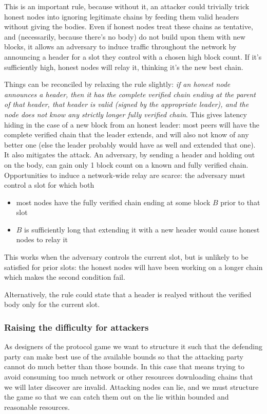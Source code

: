 \documentclass{article}
\theoremstyle{definition}{
  \newtheorem{lemma}{Lemma}[section] %
  \newtheorem{definition}[lemma]{Definition}
}
\theoremstyle{theorem}{
  \newtheorem{invariant}[lemma]{Invariant}
  \newtheorem{proofobligation}[lemma]{Proof Obligation}
}
\numberwithin{equation}{lemma}
\begin{document}
This is an important rule, because without it, an attacker could trivially
trick honest nodes into ignoring legitimate chains by feeding them valid
headers without giving the bodies. Even if honest nodes treat these chains as
tentative, and (necessarily, because there's no body) do not build upon them
with new blocks, it allows an adversary to induce traffic throughout the
network by announcing a header for a slot they control with a chosen high
block count. If it's sufficiently high, honest nodes will relay it, thinking
it's the new best chain.

Things can be reconciled by relaxing the rule slightly: \emph{if an honest node
announces a header, then it has the complete verified chain ending at the
\emph{parent} of that header, that header is valid (signed by the appropriate
leader), and the node does not know any strictly longer fully verified chain}.
This gives latency hiding in the case of a new block from an honest leader:
most peers will have the complete verified chain that the leader extends, and
will also not know of any better one (else the leader probably would have as
well and extended that one). It also mitigates the attack. An adversary, by
sending a header and holding out on the body, can gain only 1 block count on a
known and fully verified chain. Opportunities to induce a network-wide relay
are scarce: the adversary must control a slot for which both
\begin{itemize}
  \item most nodes have the fully verified chain ending at some block $B$ prior
    to that slot
  \item $B$ is sufficiently long that extending it with a new header would
    cause honest nodes to relay it
\end{itemize}
This works when the adversary controls the current slot, but is unlikely to be
satisfied for prior slots: the honest nodes will have been working on a longer
chain which makes the second condition fail.

Alternatively, the rule could state that a header is realyed without the
verified body only for the current slot.

\subsubsection{Raising the difficulty for attackers}

As designers of the protocol game we want to structure it such that the
defending party can make best use of the available bounds so that the attacking
party cannot do much better than those bounds. In this case that means trying
to avoid consuming too much network or other resources downloading chains that
we will later discover are invalid. Attacking nodes can lie, and we must
structure the game so that we can catch them out on the lie within bounded and
reasonable resources.
\end{document}

